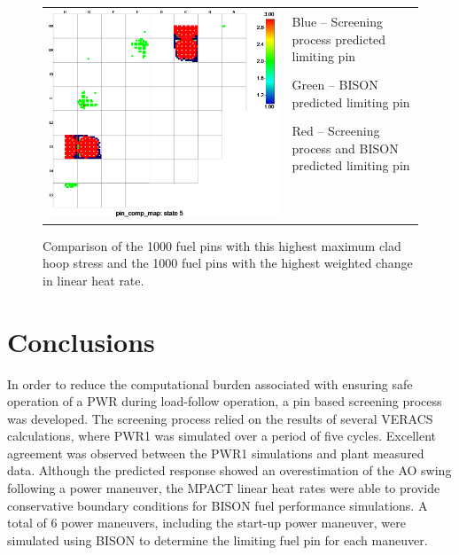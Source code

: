 \documentclass[edeposit,fullpage,11pt]{uiucthesis2009}
\begin{document}
\begin{center}
\begin{figure}[h]
\begin{tabular}{ll}
\multirow{ 11}{*}{\includegraphics[trim={0 0 4.5cm 0},clip,width=0.4\linewidth]{./Figures/screening/comp5.png}} & Blue -- Screening process predicted limiting pin \\
                                                                                                               & Green -- BISON predicted limiting pin \\
                                                                                                               & Red -- Screening process and BISON predicted limiting pin \\  
&\\
&\\
&\\
&\\
&\\
&\\
&\\
&\\
\end{tabular}
\caption{Comparison of the 1000 fuel pins with this highest maximum clad hoop stress and the 1000 fuel pins with the highest weighted change in linear heat rate.}
\label{fig:comp}
\end{figure}
\end{center}
\chapter{Conclusions}

In order to reduce the computational burden associated with ensuring safe operation of a \gls{PWR} during load-follow operation, a pin based screening process was developed.
The screening process relied on the results of several \gls{VERACS} calculations, where PWR1 was simulated over a period of five cycles.
Excellent agreement was observed between the PWR1 simulations and plant measured data.
Although the predicted response showed an overestimation of the \gls{AO} swing following a power maneuver, the MPACT linear heat rates were able to provide conservative boundary conditions for BISON fuel performance simulations.
A total of 6 power maneuvers, including the start-up power maneuver, were simulated using BISON to determine the limiting fuel pin for each maneuver.
\end{document}
